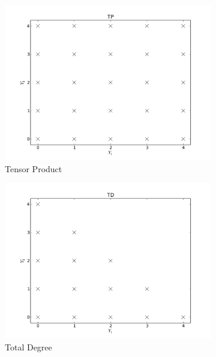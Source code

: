 \documentclass[11pt]{article}
\begin{document}
\begin{figure}[H]
\centering
  \begin{subfigure}[b]{0.32 \textwidth}
   \includegraphics[width=\textwidth]{TP}
   \caption{Tensor Product}
   \label{TP}
  \end{subfigure}
  \begin{subfigure}[b]{0.32 \textwidth}
   \includegraphics[width=\textwidth]{TD}
   \caption{Total Degree}
   \label{TD}
  \end{subfigure}
  \begin{subfigure}[b]{0.32 \textwidth}

\end{subfigure}
\end{figure}
\end{document}
